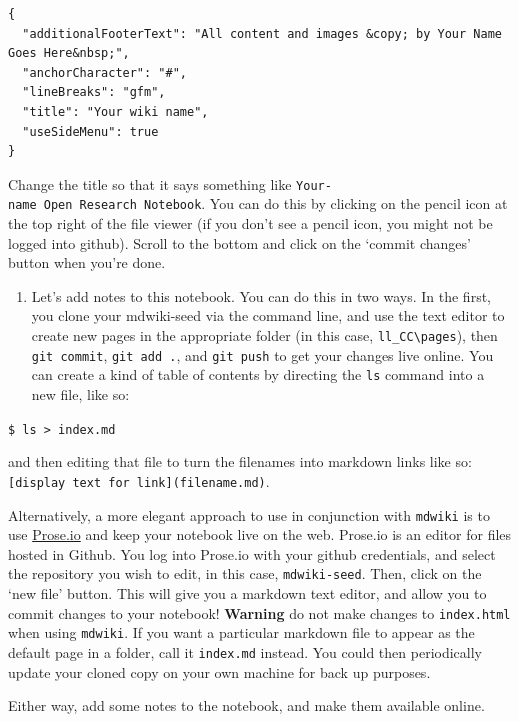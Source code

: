 \documentclass[english,]{book}
\providecommand{\tightlist}{%
  \setlength{\itemsep}{0pt}\setlength{\parskip}{0pt}}
\begin{document}
\begin{verbatim}
{
  "additionalFooterText": "All content and images &copy; by Your Name Goes Here&nbsp;",
  "anchorCharacter": "#",
  "lineBreaks": "gfm",
  "title": "Your wiki name",
  "useSideMenu": true
}
\end{verbatim}

Change the title so that it says something like
\texttt{Your-name\ Open\ Research\ Notebook}. You can do this by
clicking on the pencil icon at the top right of the file viewer (if you
don't see a pencil icon, you might not be logged into github). Scroll to
the bottom and click on the `commit changes' button when you're done.

\begin{enumerate}
\def\labelenumi{\alph{enumi}.}
\setcounter{enumi}{3}
\tightlist
\item
  Let's add notes to this notebook. You can do this in two ways. In the
  first, you clone your mdwiki-seed via the command line, and use the
  text editor to create new pages in the appropriate folder (in this
  case, \texttt{ll\_CC\textbackslash{}pages}), then
  \texttt{git\ commit}, \texttt{git\ add\ .}, and \texttt{git\ push} to
  get your changes live online. You can create a kind of table of
  contents by directing the \texttt{ls} command into a new file, like
  so:
\end{enumerate}

\texttt{\$\ ls\ \textgreater{}\ index.md}

and then editing that file to turn the filenames into markdown links
like so: \texttt{{[}display\ text\ for\ link{]}(filename.md)}.

Alternatively, a more elegant approach to use in conjunction with
\texttt{mdwiki} is to use \href{http://prose.io}{Prose.io} and keep your
notebook live on the web. Prose.io is an editor for files hosted in
Github. You log into Prose.io with your github credentials, and select
the repository you wish to edit, in this case, \texttt{mdwiki-seed}.
Then, click on the `new file' button. This will give you a markdown text
editor, and allow you to commit changes to your notebook!
\textbf{Warning} do not make changes to \texttt{index.html} when using
\texttt{mdwiki}. If you want a particular markdown file to appear as the
default page in a folder, call it \texttt{index.md} instead. You could
then periodically update your cloned copy on your own machine for back
up purposes.

Either way, add some notes to the notebook, and make them available
online.
\end{document}
